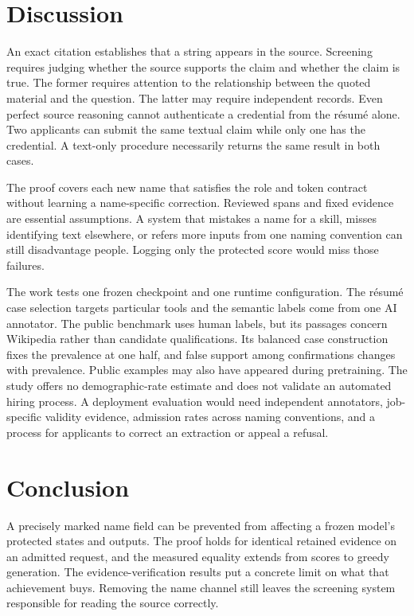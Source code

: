 \documentclass[11pt,a4paper]{article}
\begin{document}
\section{Discussion}

An exact citation establishes that a string appears in the source. Screening requires judging whether the source supports the claim and whether the claim is true. The former requires attention to the relationship between the quoted material and the question. The latter may require independent records. Even perfect source reasoning cannot authenticate a credential from the résumé alone. Two applicants can submit the same textual claim while only one has the credential. A text-only procedure necessarily returns the same result in both cases.

The proof covers each new name that satisfies the role and token contract without learning a name-specific correction. Reviewed spans and fixed evidence are essential assumptions. A system that mistakes a name for a skill, misses identifying text elsewhere, or refers more inputs from one naming convention can still disadvantage people. Logging only the protected score would miss those failures.

The work tests one frozen checkpoint and one runtime configuration. The résumé case selection targets particular tools and the semantic labels come from one AI annotator. The public benchmark uses human labels, but its passages concern Wikipedia rather than candidate qualifications. Its balanced case construction fixes the prevalence at one half, and false support among confirmations changes with prevalence. Public examples may also have appeared during pretraining. The study offers no demographic-rate estimate and does not validate an automated hiring process. A deployment evaluation would need independent annotators, job-specific validity evidence, admission rates across naming conventions, and a process for applicants to correct an extraction or appeal a refusal.

\FloatBarrier



\FloatBarrier

\section{Conclusion}

A precisely marked name field can be prevented from affecting a frozen model's protected states and outputs. The proof holds for identical retained evidence on an admitted request, and the measured equality extends from scores to greedy generation. The evidence-verification results put a concrete limit on what that achievement buys. Removing the name channel still leaves the screening system responsible for reading the source correctly.
\end{document}
